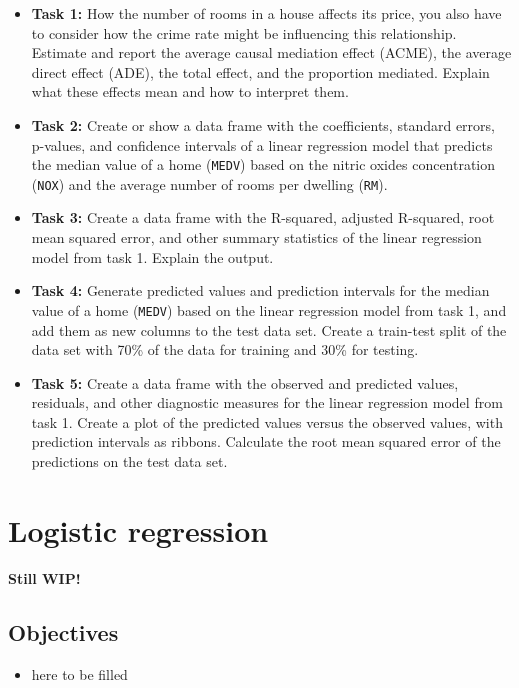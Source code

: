 \documentclass[
]{book}
\providecommand{\tightlist}{%
  \setlength{\itemsep}{0pt}\setlength{\parskip}{0pt}}
\begin{document}
\begin{itemize}
\item
  \textbf{Task 1:} How the number of rooms in a house affects its price, you also have to consider how the crime rate might be influencing this relationship. Estimate and report the average causal mediation effect (ACME), the average direct effect (ADE), the total effect, and the proportion mediated. Explain what these effects mean and how to interpret them.
\item
  \textbf{Task 2:} Create or show a data frame with the coefficients, standard errors, p-values, and confidence intervals of a linear regression model that predicts the median value of a home (\texttt{MEDV}) based on the nitric oxides concentration (\texttt{NOX}) and the average number of rooms per dwelling (\texttt{RM}).
\item
  \textbf{Task 3:} Create a data frame with the R-squared, adjusted R-squared, root mean squared error, and other summary statistics of the linear regression model from task 1. Explain the output.
\item
  \textbf{Task 4:} Generate predicted values and prediction intervals for the median value of a home (\texttt{MEDV}) based on the linear regression model from task 1, and add them as new columns to the test data set. Create a train-test split of the data set with 70\% of the data for training and 30\% for testing.
\item
  \textbf{Task 5:} Create a data frame with the observed and predicted values, residuals, and other diagnostic measures for the linear regression model from task 1. Create a plot of the predicted values versus the observed values, with prediction intervals as ribbons. Calculate the root mean squared error of the predictions on the test data set.
\end{itemize}

\hypertarget{log-est}{%
\chapter{Logistic regression}\label{log-est}}

\textbf{Still WIP!}

\hypertarget{objectives-8}{%
\section{Objectives}\label{objectives-8}}

\begin{itemize}
\tightlist
\item
  here to be filled
\end{itemize}
\end{document}
